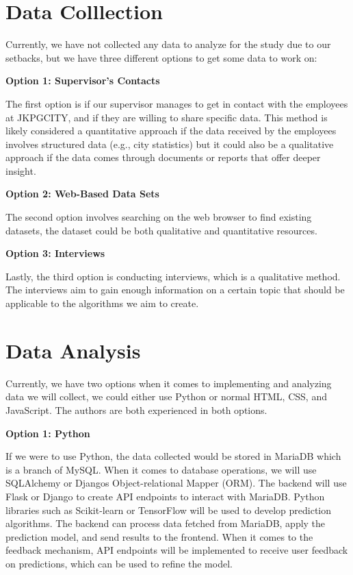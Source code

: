 \section{Data Colllection}

Currently, we have not collected any data to analyze for the study due to our setbacks, but we have three different options to get some data to work on:

\textbf{Option 1: Supervisor's Contacts }


The first option is if our supervisor manages to get in contact with the employees at JKPGCITY, and if they are willing to share specific data. This method is likely considered a quantitative approach if the data received by the employees involves structured data (e.g., city statistics) but it could also be a qualitative approach if the data comes through documents or reports that offer deeper insight. 


\textbf{Option 2: Web-Based Data Sets}


The second option involves searching on the web browser to find existing datasets, the dataset could be both qualitative and quantitative resources. 


\textbf{Option 3: Interviews}


Lastly, the third option is conducting interviews, which is a qualitative method. The interviews aim to gain enough information on a certain topic that should be applicable to the algorithms we aim to create.
 

\section{Data Analysis}
Currently, we have two options when it comes to implementing and analyzing data we will collect, we could either use Python or normal HTML, CSS, and JavaScript. The authors are both experienced in both options. 

\textbf{Option 1: Python}


If we were to use Python, the data collected would be stored in MariaDB which is a branch of MySQL. When it comes to database operations, we will use SQLAlchemy or Djangos Object-relational Mapper (ORM). The backend will use Flask or Django to create API endpoints to interact with MariaDB.
Python libraries such as Scikit-learn or TensorFlow will be used to develop prediction algorithms. The backend can process data fetched from MariaDB, apply the prediction model, and send results to the frontend.
When it comes to the feedback mechanism, API endpoints will be implemented to receive user feedback on predictions, which can be used to refine the model.

